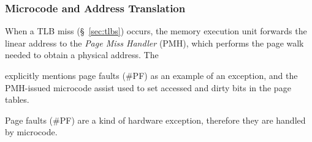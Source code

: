 \subsubsection{Microcode and Address Translation}


When a TLB miss (\S~\ref{sec:tlbs}) occurs, the memory execution unit forwards
the linear address to the \textit{Page Miss Handler} (PMH), which performs the
page walk needed to obtain a physical address. The


\cite{intel1999events} explicitly mentions
page faults (\#PF) as an example of an exception, and the PMH-issued microcode
assist used to set accessed and dirty bits in the page tables.

Page faults (\#PF) are a kind of hardware exception, therefore they are handled
by microcode.









